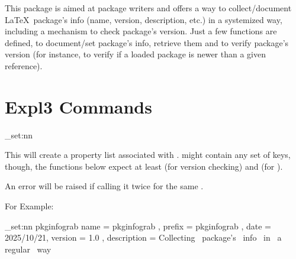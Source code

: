 \documentclass[10pt]{article}
\begin{document}
  

\begin{typesetabstract}

This package is aimed at package writers and offers a way to collect/document \LaTeX\ package's info (name, version, description, etc.) in a systemized way, including a mechanism to check package's version. Just a few functions are defined, to document/set package's info, retrieve them and to verify package's version (for instance, to verify if a loaded package is newer than a given reference).

\end{typesetabstract}





\section{Expl3 Commands}\label{expl3-cmds}


\begin{codedescribe}{\pkginfograb_set:nn}
\begin{codesyntax}%
\end{codesyntax}
This will create a property list associated with .  might contain any set of keys, though, the functions below expect at least  (for version checking) and  (for ).
\end{codedescribe}
\begin{tsremark}
  An error will be raised if calling it twice for the same .
\end{tsremark}

 For Example:
\begin{codestore}[demoA]
\pkginfograb_set:nn {pkginfograb}
  { 
    name         = {pkginfograb} ,
    prefix       = {pkginfograb} ,
    date         = {2025/10/21},
    version      = {1.0} ,
    description  = {Collecting~ package's~ info~ in~ a~ regular~ way}
  }
\end{codestore}
\end{document}
